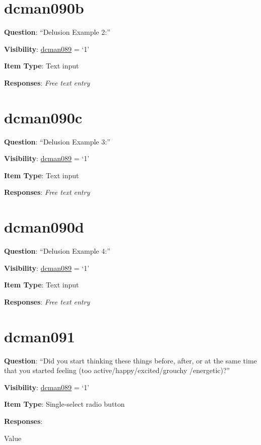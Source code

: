\documentclass[]{book}
\begin{document}
\hypertarget{dcman090b}{%
\section{dcman090b}\label{dcman090b}}

\textbf{Question}: ``Delusion Example 2:''

\textbf{Visibility}: \protect\hyperlink{dcman089}{dcman089} = `1'

\textbf{Item Type}: Text input

\textbf{Responses}: \emph{Free text entry}

\hypertarget{dcman090c}{%
\section{dcman090c}\label{dcman090c}}

\textbf{Question}: ``Delusion Example 3:''

\textbf{Visibility}: \protect\hyperlink{dcman089}{dcman089} = `1'

\textbf{Item Type}: Text input

\textbf{Responses}: \emph{Free text entry}

\hypertarget{dcman090d}{%
\section{dcman090d}\label{dcman090d}}

\textbf{Question}: ``Delusion Example 4:''

\textbf{Visibility}: \protect\hyperlink{dcman089}{dcman089} = `1'

\textbf{Item Type}: Text input

\textbf{Responses}: \emph{Free text entry}

\hypertarget{dcman091}{%
\section{dcman091}\label{dcman091}}

\textbf{Question}: ``Did you start thinking these things before, after, or at the same time that you started feeling (too active/happy/excited/grouchy /energetic)?''

\textbf{Visibility}: \protect\hyperlink{dcman089}{dcman089} = `1'

\textbf{Item Type}: Single-select radio button

\textbf{Responses}:

Value
\end{document}
